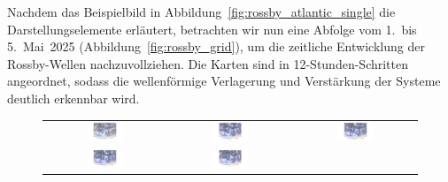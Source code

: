 Nachdem das Beispielbild in Abbildung~\ref{fig:rossby_atlantic_single} die
Darstellungselemente erläutert, betrachten wir nun eine Abfolge vom 1.\ bis 5.\ Mai~2025
(Abbildung~\ref{fig:rossby_grid}), um die zeitliche Entwicklung der Rossby-Wellen
nachzuvollziehen. Die Karten sind in 12-Stunden-Schritten angeordnet, sodass die
wellenförmige Verlagerung und Verstärkung der Systeme deutlich erkennbar wird.


\begin{figure}
	\centering
	\renewcommand{\arraystretch}{0.5}
	\begin{tabular}{ccc}
		\includegraphics[width=0.32\textwidth, trim=5.75cm 3cm 5cm 0.9cm, clip]{papers/rossby/images/weather/data_2025_5_1_00-00_500.pdf} &
		\includegraphics[width=0.32\textwidth, trim=5.75cm 3cm 5cm 0.9cm, clip]{papers/rossby/images/weather/data_2025_5_1_12-00_500.pdf} &
		\includegraphics[width=0.32\textwidth, trim=5.75cm 3cm 5cm 0.9cm, clip]{papers/rossby/images/weather/data_2025_5_2_00-00_500.pdf}   \\
		\includegraphics[width=0.32\textwidth, trim=5.75cm 3cm 5cm 0.9cm, clip]{papers/rossby/images/weather/data_2025_5_2_12-00_500.pdf} &
		\includegraphics[width=0.32\textwidth, trim=5.75cm 3cm 5cm 0.9cm, clip]{papers/rossby/images/weather/data_2025_5_3_00-00_500.pdf} &

\end{tabular}
\end{figure}
